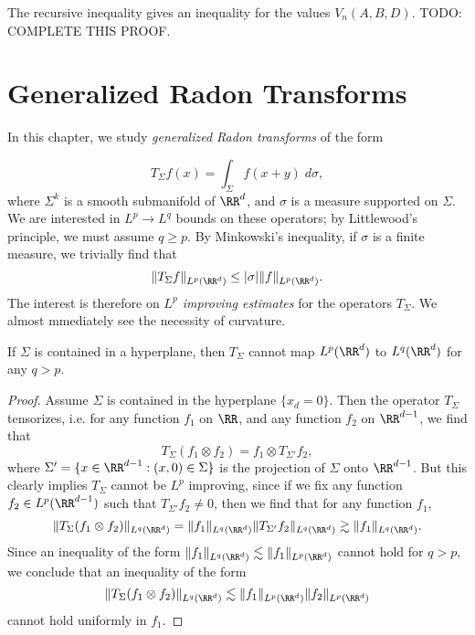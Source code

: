 The recursive inequality gives an inequality for the values $V_n(A,B,D)$. TODO: COMPLETE THIS PROOF.






\chapter{Generalized Radon Transforms}

In this chapter, we study \emph{generalized Radon transforms} of the form

\[ T_\Sigma f(x) = \int_\Sigma f(x + y)\; d\sigma, \]
%
where $\Sigma^k$ is a smooth submanifold of $\RR^d$, and $\sigma$ is a measure supported on $\Sigma$. We are interested in $L^p \to L^q$ bounds on these operators; by Littlewood's principle, we must assume $q \geq p$. By Minkowski's inequality, if $\sigma$ is a finite measure, we trivially find that
%
\[\| T_\Sigma f \|_{L^p(\RR^d)} \leq |\sigma| \| f \|_{L^p(\RR^d)}. \]
%
The interest is therefore on \emph{$L^p$ improving estimates} for the operators $T_\Sigma$. We almost mmediately see the necessity of curvature.

\begin{theorem}
    If $\Sigma$ is contained in a hyperplane, then $T_\Sigma$ cannot map $L^p(\RR^d)$ to $L^q(\RR^d)$ for any $q > p$. 
\end{theorem}
\begin{proof}
    Assume $\Sigma$ is contained in the hyperplane $\{ x_d = 0 \}$. Then the operator $T_\Sigma$ tensorizes, i.e. for any function $f_1$ on $\RR$, and any function $f_2$ on $\RR^{d-1}$, we find that
    \[ T_\Sigma(f_1 \otimes f_2) = f_1 \otimes T_{\Sigma'} f_2, \]
    where $\Sigma' = \{ x \in \RR^{d-1} : (x,0) \in \Sigma \}$ is the projection of $\Sigma$ onto $\RR^{d-1}$. But this clearly implies $T_\Sigma$ cannot be $L^p$ improving, since if we fix any function $f_2 \in L^p(\RR^{d-1})$ such that $T_{\Sigma'} f_2 \neq 0$, then we find that for any function $f_1$,
    \[ \| T_\Sigma (f_1 \otimes f_2) \|_{L^q(\RR^d)} = \| f_1 \|_{L^q(\RR^d)} \| T_{\Sigma'} f_2 \|_{L^q(\RR^d)} \gtrsim \| f_1 \|_{L^q(\RR^d)}. \]
    Since an inequality of the form $\| f_1 \|_{L^q(\RR^d)} \lesssim \| f_1 \|_{L^p(\RR^d)}$ cannot hold for $q > p$, we conclude that an inequality of the form
    \[ \| T_\Sigma (f_1 \otimes f_2) \|_{L^q(\RR^d)} \lesssim \| f_1 \|_{L^p(\RR^d)} \| f_2 \|_{L^p(\RR^d)} \]
    cannot hold uniformly in $f_1$.
\end{proof}

